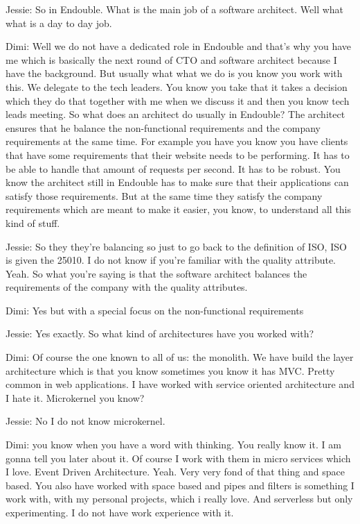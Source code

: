 Jessie: So in Endouble. What is the main job of a software architect. Well what what is a day to day job.

Dimi: Well we do not have a dedicated role in Endouble and that's why you have me which is basically the next round of CTO and software architect because I have the background. But usually what what we do is you know you work with this. We delegate to the tech leaders. You know you take that it takes a decision which they do that together with me when we discuss it and then you know tech leads meeting. So what does an architect do usually in Endouble? The architect ensures that he balance the non-functional requirements and the company requirements at the same time. For example you have you know you have clients that have some requirements that their website needs to be performing. It has to be able to handle that amount of requests per second. It has to be robust. You know the architect still in Endouble has to make sure that their applications can satisfy those requirements. But at the same time they satisfy the company requirements which are meant to make it easier, you know, to understand all this kind of stuff.

Jessie: So they they're balancing so just to go back to the definition of ISO, ISO is given the 25010. I do not know if you're familiar with the quality attribute. Yeah. So what you're saying is that the software architect balances the requirements of the company with the quality attributes.

Dimi: Yes but with a special focus on the non-functional requirements

Jessie: Yes exactly. So what kind of architectures have you worked with?

Dimi: Of course the one known to all of us: the monolith. We have build the layer architecture which is that you know sometimes you know it has MVC. Pretty common in web applications. I have worked with service oriented architecture and I hate it. Microkernel you know?

Jessie: No I do not know microkernel.

Dimi: you know when you have a word with thinking. You really know it. I am gonna tell you later about it. Of course I work with them in micro services which I love. Event Driven Architecture. Yeah. Very very fond of that thing and space based. You also have worked with space based and pipes and filters is something I work with, with my personal projects, which i really love. And serverless but only experimenting. I do not have work experience with it.

